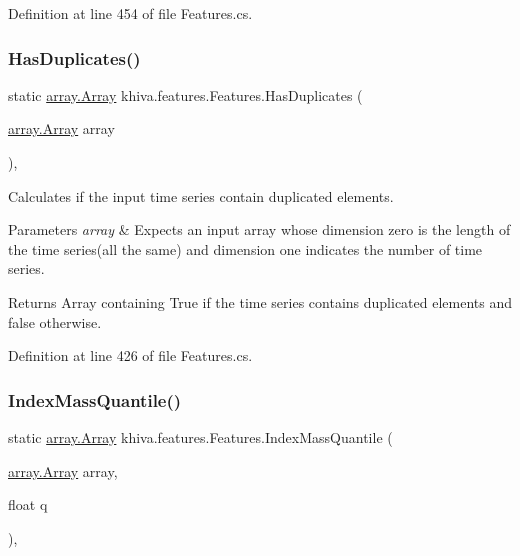 Definition at line 454 of file Features.\+cs.

\mbox{\label{classkhiva_1_1features_1_1_features_ab7e5472a6a67a3d7116c278a98a82545}} 
\subsubsection{\texorpdfstring{Has\+Duplicates()}{HasDuplicates()}}
{\footnotesize\ttfamily static \mbox{\hyperlink{classkhiva_1_1array_1_1_array}{array.\+Array}} khiva.\+features.\+Features.\+Has\+Duplicates (\begin{DoxyParamCaption}\item[{\mbox{\hyperlink{classkhiva_1_1array_1_1_array}{array.\+Array}}}]{array }\end{DoxyParamCaption})\hspace{0.3cm}{\ttfamily [inline]}, {\ttfamily [static]}}



Calculates if the input time series contain duplicated elements. 


\begin{DoxyParams}{Parameters}
{\em array} & Expects an input array whose dimension zero is the length of the time series(all the same) and dimension one indicates the number of time series.\\
\hline
\end{DoxyParams}
\begin{DoxyReturn}{Returns}
Array containing True if the time series contains duplicated elements and false otherwise.
\end{DoxyReturn}


Definition at line 426 of file Features.\+cs.

\mbox{\label{classkhiva_1_1features_1_1_features_a0fc139d3350ca0fa6774bd5a4003061a}} 
\subsubsection{\texorpdfstring{Index\+Mass\+Quantile()}{IndexMassQuantile()}}
{\footnotesize\ttfamily static \mbox{\hyperlink{classkhiva_1_1array_1_1_array}{array.\+Array}} khiva.\+features.\+Features.\+Index\+Mass\+Quantile (\begin{DoxyParamCaption}\item[{\mbox{\hyperlink{classkhiva_1_1array_1_1_array}{array.\+Array}}}]{array,  }\item[{float}]{q }\end{DoxyParamCaption})\hspace{0.3cm}{\ttfamily [inline]}, {\ttfamily [static]}}




